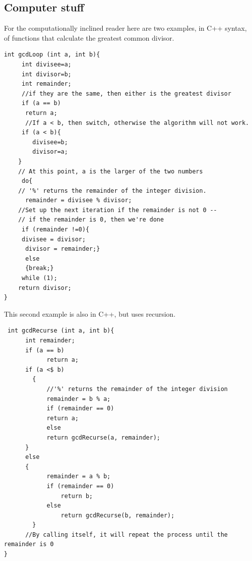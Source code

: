 \subsection{Computer stuff}
For the computationally inclined reader here are two examples, in C++ syntax, of functions that calculate the greatest common divisor.

\begin{verbatim}
int gcdLoop (int a, int b){
	 int divisee=a;
	 int divisor=b;
	 int remainder;
	 //if they are the same, then either is the greatest divisor
	 if (a == b)
	  return a;
	  //If a < b, then switch, otherwise the algorithm will not work.
	 if (a < b){
		divisee=b;
		divisor=a;
	}
	// At this point, a is the larger of the two numbers
	 do{
	// '%' returns the remainder of the integer division.
	  remainder = divisee % divisor;
	//Set up the next iteration if the remainder is not 0 -- 
	// if the remainder is 0, then we're done
	 if (remainder !=0){
	 divisee = divisor;
	  divisor = remainder;}
	  else
	  {break;}
	 while (1);
	return divisor;
}
\end{verbatim}

This second example is also in C++, but uses recursion.

\begin{verbatim}
 int gcdRecurse (int a, int b){ 
	  int remainder; 
	  if (a == b) 
	    	return a; 
	  if (a <$ b) 
	    { 
	    	//'%' returns the remainder of the integer division 
	    	remainder = b % a; 
	    	if (remainder == 0) 
	      	return a; 
	    	else 
	      	return gcdRecurse(a, remainder);  
	  }  
	  else 
	  { 
	    	remainder = a % b; 
	    	if (remainder == 0) 
	      		return b; 
	    	else 
	      		return gcdRecurse(b, remainder); 
	    } 	
	  //By calling itself, it will repeat the process until the remainder is 0 
} 
\end{verbatim}

